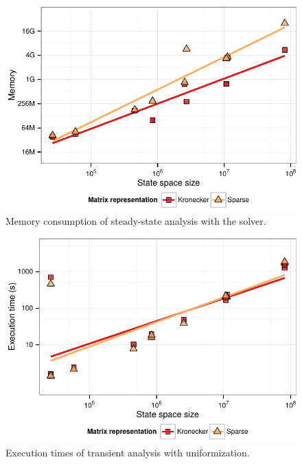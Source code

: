 \begin{figure}
  \centering
  \includegraphics{figures/Bicgstab_matrix_memory}
  \caption{Memory consumption of steady-state analysis with the
     solver.}
  \label{fig:evaluation:bicgstab-memory}
\end{figure}

\begin{figure}
  \centering
  \includegraphics{figures/Uniformization_matrix_time}
  \caption{Execution times of transient analysis with
    uniformization.}
  \label{fig:evaluation:uniformization-time}
\end{figure}

